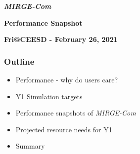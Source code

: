\def\CC{{C\nolinebreak[4]\hspace{-.05em}\raisebox{.4ex}{\tiny\bf ++}}}

\begin{frame}\frametitle{}
\vspace*{0.2in}
\centerline{\textrm{{\huge\bfseries\color{myOrange} \textit{MIRGE-Com}}}}
\smallskip
\centerline{\textrm{{\huge\bfseries\color{myOrange} Performance Snapshot}}}
\smallskip
\smallskip
\centerline{\textrm{{\large\bfseries{Fri@CEESD - February 26, 2021}}}}
\vspace*{0.2in}
\begin{center}
\vspace*{0.4in}
\end{center}
\end{frame}

\begin{frame}\frametitle{Outline}
\begin{itemize}
\item Performance - why do users care?
\item Y1 Simulation targets
\item Performance snapshots of \textit{MIRGE-Com}
\item Projected resource needs for Y1
\item Summary
\end{itemize}
\end{frame}




